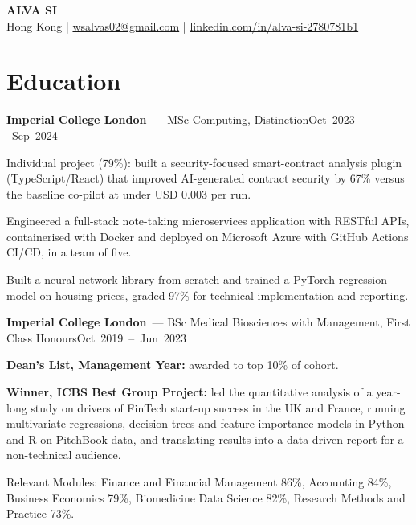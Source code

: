 \documentclass[10pt,a4paper]{article}
\newcommand{\entry}[3]{\vspace{4pt}\textbf{#1}\ #2\hfill\mbox{#3}\par\vspace{1pt}}
\newcommand{\lead}[1]{\textbf{#1}}
\begin{document}
\begin{center}
  {\LARGE\bfseries ALVA SI}\\[2pt]
  Hong Kong \;|\; \href{mailto:wsalvas02@gmail.com}{wsalvas02@gmail.com} \;|\;
  \href{https://linkedin.com/in/alva-si-2780781b1}{\textcolor{link}{linkedin.com/in/alva-si-2780781b1}}
\end{center}
\vspace{-4pt}

\section{Education}

\entry{Imperial College London}{--- MSc Computing, Distinction}{Oct 2023 -- Sep 2024}
\begin{bul}
  \item Individual project (79\%): built a security-focused smart-contract analysis plugin (TypeScript/React) that improved AI-generated contract security by 67\% versus the baseline co-pilot at under USD 0.003 per run.
  \item Engineered a full-stack note-taking microservices application with RESTful APIs, containerised with Docker and deployed on Microsoft Azure with GitHub Actions CI/CD, in a team of five.
  \item Built a neural-network library from scratch and trained a PyTorch regression model on housing prices, graded 97\% for technical implementation and reporting.
\end{bul}

\entry{Imperial College London}{--- BSc Medical Biosciences with Management, First Class Honours}{Oct 2019 -- Jun 2023}
\begin{bul}
  \item \lead{Dean's List, Management Year:} awarded to top 10\% of cohort.
  \item \lead{Winner, ICBS Best Group Project:} led the quantitative analysis of a year-long study on drivers of FinTech start-up success in the UK and France, running multivariate regressions, decision trees and feature-importance models in Python and R on PitchBook data, and translating results into a data-driven report for a non-technical audience.
  \item Relevant Modules: Finance and Financial Management 86\%, Accounting 84\%, Business Economics 79\%, Biomedicine Data Science 82\%, Research Methods and Practice 73\%.
\end{bul}
\end{document}
